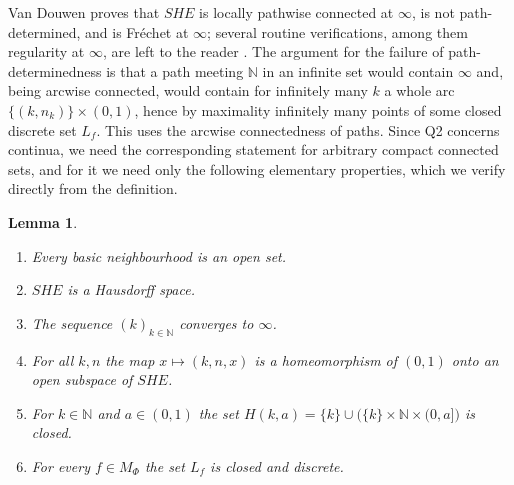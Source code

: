 \documentclass[11pt]{amsart}
\newtheorem{lemma}[theorem]{Lemma}
\theoremstyle{definition}
\theoremstyle{remark}
\newcommand{\N}{\mathbb{N}}
\newcommand{\SHE}{\mathit{SHE}}
\numberwithin{equation}{section}
\begin{document}
Van Douwen proves that $\SHE$ is locally pathwise connected at $\infty$, is not path-determined, and is Fr\'echet at $\infty$; several routine verifications, among them regularity at $\infty$, are left to the reader \cite[p.~433]{vandouwen81}. The argument for the failure of path-determinedness is that a path meeting $\N$ in an infinite set would contain $\infty$ and, being arcwise connected, would contain for infinitely many $k$ a whole arc $\{(k,n_k)\}\times(0,1)$, hence by maximality infinitely many points of some closed discrete set $L_f$. This uses the arcwise connectedness of paths. Since Q2 concerns continua, we need the corresponding statement for arbitrary compact connected sets, and for it we need only the following elementary properties, which we verify directly from the definition.

\begin{lemma}\label{lem:SHEbasic}
\begin{enumerate}[label=\textup{(\arabic*)}]
\item Every basic neighbourhood is an open set.
\item $\SHE$ is a Hausdorff space.
\item The sequence $(k)_{k\in\N}$ converges to $\infty$.
\item For all $k,n$ the map $x\mapsto(k,n,x)$ is a homeomorphism of $(0,1)$ onto an open subspace of $\SHE$.
\item For $k\in\N$ and $a\in(0,1)$ the set $H(k,a)=\{k\}\cup\bigl(\{k\}\times\N\times(0,a]\bigr)$ is closed.
\item For every $f\in M_\Phi$ the set $L_f$ is closed and discrete.
\end{enumerate}
\end{lemma}
\end{document}

